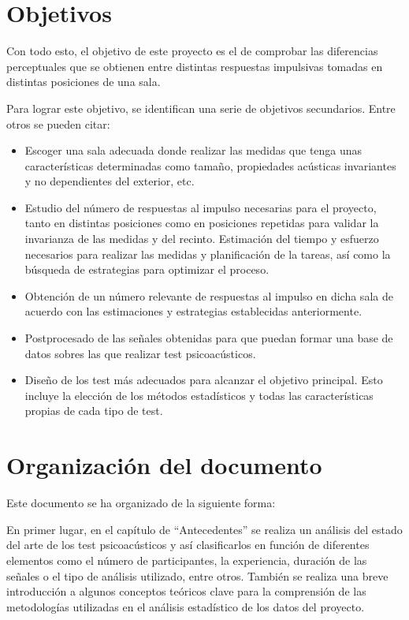 \documentclass[11pt,a4paper]{book}
\begin{document}
    \section{Objetivos}
        Con todo esto, el objetivo de este proyecto es el de comprobar las diferencias perceptuales que se obtienen entre distintas respuestas impulsivas tomadas en distintas posiciones de una sala.\newline
        
        Para lograr este objetivo, se identifican una serie de objetivos secundarios. Entre otros se pueden citar:
        
        \begin{itemize}
            \item Escoger una sala adecuada donde realizar las medidas que tenga unas características determinadas como tamaño, propiedades acústicas invariantes y no dependientes del exterior, etc.
            \item Estudio del número de respuestas al impulso necesarias para el proyecto, tanto en distintas posiciones como en posiciones repetidas para validar la invarianza de las medidas y del recinto. Estimación del tiempo y esfuerzo necesarios para realizar las medidas y planificación de la tareas, así como la búsqueda de estrategias para optimizar el proceso.
            \item Obtención de un número relevante de respuestas al impulso en dicha sala de acuerdo con las estimaciones y estrategias establecidas anteriormente.
            \item Postprocesado de las señales obtenidas para que puedan formar una base de datos sobres las que realizar test psicoacústicos.
            \item Diseño de los test más adecuados para alcanzar el objetivo principal. Esto incluye la elección de los métodos estadísticos y todas las características propias de cada tipo de test.
      
        \end{itemize}
        
    \section{Organización del documento}
        Este documento se ha organizado de la siguiente forma:
        
        En primer lugar, en el capítulo de ``Antecedentes'' se realiza un análisis del estado del arte de los test psicoacústicos y así clasificarlos en función de diferentes elementos como el número de participantes, la experiencia, duración de las señales o el tipo de análisis utilizado, entre otros. También se realiza una breve introducción a algunos conceptos teóricos clave para la comprensión de las metodologías utilizadas en el análisis estadístico de los datos del proyecto.
        
\end{document}
